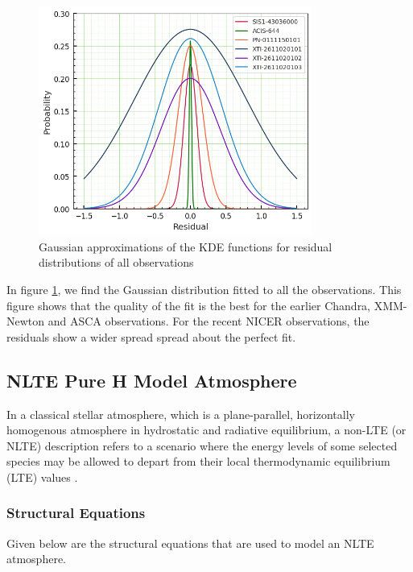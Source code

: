 			\begin{figure}[!htb]
		    	\centering
		    	\includegraphics[width=0.8\textwidth]{images/resid/mr-vel-resid-gaussfit_all-obs.png}
		    	\caption{Gaussian approximations of the KDE functions for residual distributions of all observations}
		    	\label{fig:all-obs:resid-gaussfit}
		    \end{figure}
		    
		    In figure \ref{fig:all-obs:resid-gaussfit}, we find the Gaussian distribution fitted to all the observations. This figure shows that the quality of the fit is the best for the earlier Chandra, XMM-Newton and ASCA observations. For the recent NICER observations, the residuals show a wider spread spread about the perfect fit.
    	
    	\subsection{NLTE Pure H Model Atmosphere} \label{multi-obs:discussion:nlte-pureH}
    		In a classical stellar atmosphere, which is a plane-parallel, horizontally homogenous atmosphere in hydrostatic and radiative equilibrium, a non-LTE (or NLTE) description refers to a scenario where the energy levels of some selected species may be allowed to depart from their local thermodynamic equilibrium (LTE) values \cite{hubeny2014theory}.
    	
    		\subsubsection{Structural Equations}
    			Given below are the structural equations that are used to model an NLTE atmosphere.
    			
